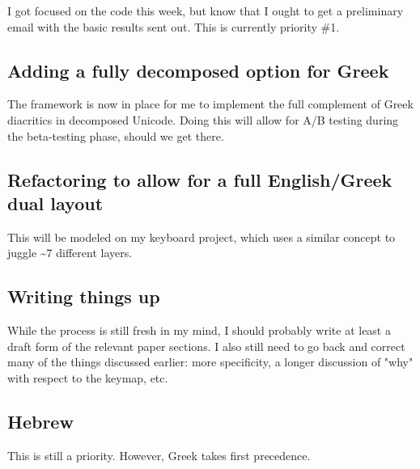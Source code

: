 \documentclass[11pt]{article}
\begin{document}
I got focused on the code this week, but know that I ought to get a preliminary email with the basic results sent out. This is currently priority \#1.

\subsection{Adding a fully decomposed option for Greek}
\label{sec:orgc0171e2}

The framework is now in place for me to implement the full complement of Greek diacritics in decomposed Unicode. Doing this will allow for A/B testing during the beta-testing phase, should we get there.

\subsection{Refactoring to allow for a full English/Greek dual layout}
\label{sec:org0708d51}

This will be modeled on my keyboard project, which uses a similar concept to juggle \textasciitilde{}7 different layers.

\subsection{Writing things up}
\label{sec:org955b650}

While the process is still fresh in my mind, I should probably write at least a draft form of the relevant paper sections. I also still need to go back and correct many of the things discussed earlier: more specificity, a longer discussion of "why" with respect to the keymap, etc.

\subsection{Hebrew}
\label{sec:org02a2b05}

This is still a priority. However, Greek takes first precedence.
\end{document}
